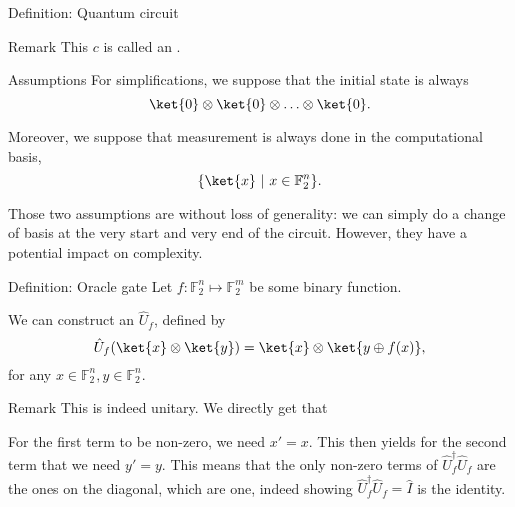 \documentclass[a4paper]{article}
\begin{document}
\begin{parag}{Definition: Quantum circuit}
\begin{subparag}{Remark}
        This $c$ is called an .
    \end{subparag}

    \begin{subparag}{Assumptions}
        For simplifications, we suppose that the initial state is always 
        \[\ket{0} \otimes \ket{0} \otimes \ldots \otimes \ket{0}.\]
        
        Moreover, we suppose that measurement is always done in the computational basis, 
        \[\left\{\ket{x} \suchthat x \in \mathbb{F}_2^n\right\}.\]
        
        Those two assumptions are without loss of generality: we can simply do a change of basis at the very start and very end of the circuit. However, they have a potential impact on complexity.
    \end{subparag}
\end{parag}

\begin{parag}{Definition: Oracle gate}
    Let $f: \mathbb{F}_2^n \mapsto \mathbb{F}_{2}^m$ be some binary function. 

    We can construct an $\hat{U}_f$, defined by 
    \[\hat{U}_f \left(\ket{x} \otimes \ket{y}\right) = \ket{x} \otimes \ket{y \oplus f\left(x\right)},\]
    for any $x \in \mathbb{F}_2^n, y \in \mathbb{F}_2^n$.

    \begin{subparag}{Remark}
        This is indeed unitary. We directly get that 
        
        For the first term to be non-zero, we need $x' = x$. This then yields for the second term that we need $y' = y$. This means that the only non-zero terms of $\hat{U}_f^{\dagger} \hat{U}_f$ are the ones on the diagonal, which are one, indeed showing $\hat{U}_f^{\dagger} \hat{U}_f = \hat{I}$ is the identity.
    \end{subparag}
\end{parag}
\end{document}
